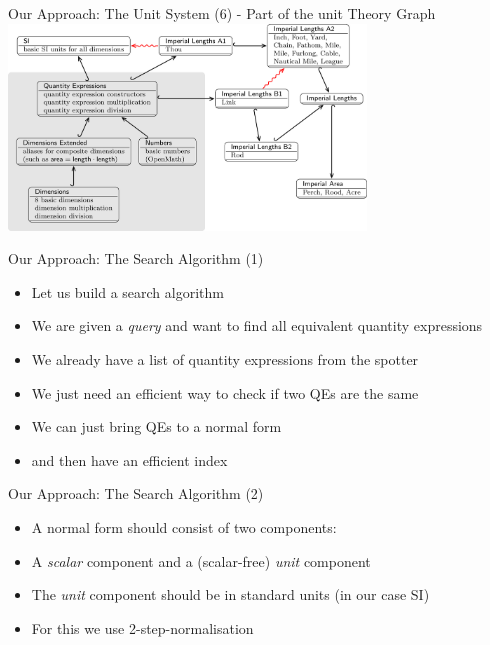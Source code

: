 \documentclass{beamer}
\begin{document}
  \begin{frame}{Our Approach: The Unit System (6) - Part of the unit Theory Graph}
    \includegraphics[width=95mm]{imgs/graph1.png}
  \end{frame}

  \begin{frame}{Our Approach: The Search Algorithm (1)}
    \begin{itemize}[<+->]
      \item Let us build a search algorithm
      \item We are given a \textit{query} and want to find all equivalent quantity expressions
      \item We already have a list of quantity expressions from the spotter
      \item We just need an efficient way to check if two QEs are the same
      \item We can just bring QEs to a normal form
      \item and then have an efficient index
    \end{itemize}
  \end{frame}

  \begin{frame}{Our Approach: The Search Algorithm (2)}
    \begin{itemize}[<+->]
      \item A normal form should consist of two components:
      \item A \textit{scalar} component and a (scalar-free) \textit{unit} component
      \item The \textit{unit} component should be in standard units (in our case SI)
      \item For this we use 2-step-normalisation
    \end{itemize}
  \end{frame}
\end{document}
